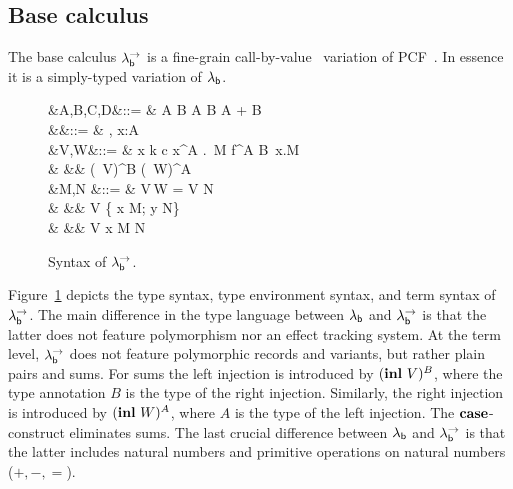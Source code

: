 \documentclass[12pt,phd,lfcs,twoside,openright,logo,leftchapter,normalheadings]{infthesis}
\theoremstyle{plain}
\theoremstyle{definition}
\begin{document}
\subsection{Base calculus}
\label{sec:base-calculus}
The base calculus $\lambda^\rightarrow_{\mathsf{b}}$ is a fine-grain
call-by-value~\cite{LevyPT03} variation of PCF~\cite{Plotkin77}.
%
In essence it is a simply-typed variation of $\lambda_{\mathsf{b}}$.
%
\begin{figure}
  \begin{syntax}
              &A,B,C,D\in\TypeCat  &::= & \Nat \mid \One \mid A \to B \mid A \times B \mid A + B \\
     &\Gamma\in\TyEnvCat &::= & \cdot \mid \Gamma, x:A \\
        &V,W\in\ValCat  &::= & x \mid k \mid c \mid \lambda x^A .\, M \mid \Rec \; f^{A \to B}\, x.M \\
                     &               &\mid& \Unit \mid {} \mid (\Inl\, V)^B \mid (\Inr\, W)^A\\
  &M,N\in\CompCat
                           &::= & V\,W
                            \mid  \Let\;  = V \; \In \; N \\
                     &     &\mid&\Case \; V \;\{ \Inl \; x \mapsto M; \Inr \; y \mapsto N\}\\
                     &    &\mid& \Return\; V
                           \mid \Let \; x \revto M \; \In \; N \\
\end{syntax}
\caption{Syntax of $\lambda^\rightarrow_{\mathsf{b}}$.}\label{fig:bpcf}
\end{figure}
%
Figure~\ref{fig:bpcf} depicts the type syntax, type environment
syntax, and term syntax of $\lambda^\rightarrow_{\mathsf{b}}$.
%
The main difference in the type language between $\lambda_{\mathsf{b}}$ and $\lambda^\rightarrow_{\mathsf{b}}$
is that the latter does not feature polymorphism nor an effect
tracking system. At the term level, $\lambda^\rightarrow_{\mathsf{b}}$ does not feature
polymorphic records and variants, but rather plain pairs and sums. For
sums the left injection is introduced by $(\mathbf{inl}~V)^B$, where the type
annotation $B$ is the type of the right injection. Similarly, the
right injection is introduced by $(\mathbf{inl}~W)^A$, where $A$ is the type
of the left injection. The $\mathbf{case}$-construct eliminates sums. The last
crucial difference between $\lambda_{\mathsf{b}}$ and $\lambda^\rightarrow_{\mathsf{b}}$ is that the latter
includes natural numbers and primitive operations on natural numbers
($+, -, =$).
%
\end{document}

